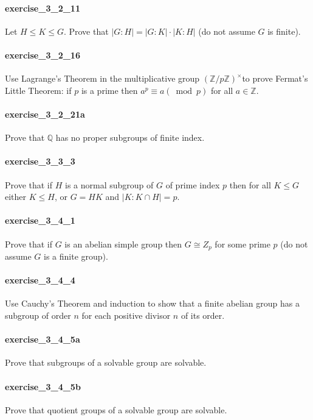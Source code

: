 \documentclass{article}
\begin{document}
\paragraph{exercise\_3\_2\_11} Let $H \leq K \leq G$. Prove that $|G: H|=|G: K| \cdot|K: H|$ (do not assume $G$ is finite).

\paragraph{exercise\_3\_2\_16} Use Lagrange's Theorem in the multiplicative group $(\mathbb{Z} / p \mathbb{Z})^{\times}$to prove Fermat's Little Theorem: if $p$ is a prime then $a^{p} \equiv a(\bmod p)$ for all $a \in \mathbb{Z}$.

\paragraph{exercise\_3\_2\_21a} Prove that $\mathbb{Q}$ has no proper subgroups of finite index.

\paragraph{exercise\_3\_3\_3} Prove that if $H$ is a normal subgroup of $G$ of prime index $p$ then for all $K \leq G$ either $K \leq H$, or $G=H K$ and $|K: K \cap H|=p$.

\paragraph{exercise\_3\_4\_1} Prove that if $G$ is an abelian simple group then $G \cong Z_{p}$ for some prime $p$ (do not assume $G$ is a finite group).

\paragraph{exercise\_3\_4\_4} Use Cauchy's Theorem and induction to show that a finite abelian group has a subgroup of order $n$ for each positive divisor $n$ of its order.

\paragraph{exercise\_3\_4\_5a} Prove that subgroups of a solvable group are solvable.

\paragraph{exercise\_3\_4\_5b} Prove that quotient groups of a solvable group are solvable.
\end{document}
